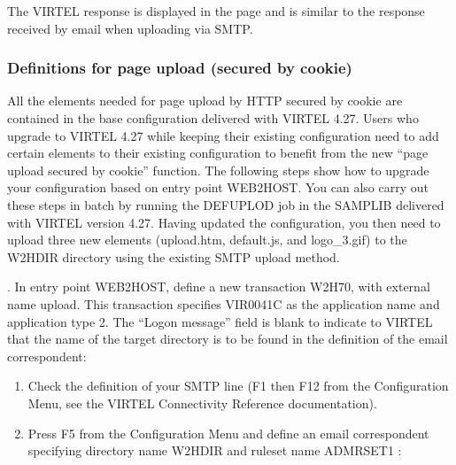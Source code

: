 \documentclass[letterpaper,10pt,english]{sphinxmanual}
\begin{document}
\sphinxAtStartPar
The VIRTEL response is displayed in the page and is similar to the response received by e\sphinxhyphen{}mail when uploading via
SMTP.


\subsubsection{Definitions for page upload (secured by cookie)}
\label{\detokenize{audit_operations_ and_performance:definitions-for-page-upload-secured-by-cookie}}
\sphinxAtStartPar
All the elements needed for page upload by HTTP secured by cookie are contained in the base configuration delivered
with VIRTEL 4.27. Users who upgrade to VIRTEL 4.27 while keeping their existing configuration need to add certain
elements to their existing configuration to benefit from the new “page upload secured by cookie” function.
The following steps show how to upgrade your configuration based on entry point WEB2HOST. You can also carry out
these steps in batch by running the DEFUPLOD job in the SAMPLIB delivered with VIRTEL version 4.27. Having updated
the configuration, you then need to upload three new elements (upload.htm, default.js, and logo\_3.gif) to the W2HDIR
directory using the existing SMTP upload method.

. In entry point WEB2HOST, define a new transaction W2H\textendash{}70, with external name upload. This transaction specifies
VIR0041C as the application name and application type 2. The “Logon message” field is blank to indicate to VIRTEL
that the name of the target directory is to be found in the definition of the e\sphinxhyphen{}mail correspondent:

\sphinxAtStartPar
{}

\sphinxAtStartPar
{}
\begin{enumerate}
%
\setcounter{enumi}{1}
\item {} 
\sphinxAtStartPar
Check the definition of your SMTP line (F1 then F12 from the Configuration Menu, see the VIRTEL Connectivity Reference documentation).

\item {} 
\sphinxAtStartPar
Press F5 from the Configuration Menu and define an e\sphinxhyphen{}mail correspondent specifying directory name W2H\sphinxhyphen{}DIR and ruleset name ADMRSET1 :

\end{enumerate}
\end{document}
